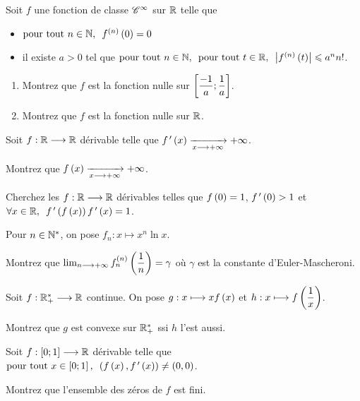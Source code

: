 \begin{exosss}
Soit \(f\) une fonction de classe \(\mathscr{C}^{\infty}\) sur \(\mathbb{R}\) telle que

\begin{itemize}
    \item \(\quantifs{\tpt n\in\N}f\deriv{n}\paren{0}=0\) \\
    \item il existe \(a>0\) tel que \(\quantifs{\tpt n\in\N;\tpt t\in\R}\abs{f\deriv{n}\paren{t}}\leq a^nn!\). \\
\end{itemize}

\begin{enumerate}
    \item Montrez que \(f\) est la fonction nulle sur \(\left[\dfrac{-1}{a};\dfrac{1}{a}\right]\). \\
    \item Montrez que \(f\) est la fonction nulle sur \(\mathbb{R}\).
\end{enumerate}
\end{exosss}

\begin{exo}
Soit \(f:\mathbb{R}\longrightarrow\mathbb{R}\) dérivable telle que \(f^{\,\prime}\left(x\right)\xrightarrow[x\longrightarrow+\infty]{}+\infty\).

Montrez que \(f\left(x\right)\xrightarrow[x\longrightarrow+\infty]{}+\infty\).
\end{exo}

\begin{exo}
Cherchez les \(f:\mathbb{R}\longrightarrow\mathbb{R}\) dérivables telles que \(f\left(0\right)=1\), \(f^{\,\prime}\left(0\right)>1\) et \(\quantifs{\forall x\in\R}f\prim\paren{f\paren{x}}f\prim\paren{x}=1\).
\end{exo}

\begin{exo}
Pour \(n\in\mathbb{N}^*\), on pose \(f_n:x\mapsto x^n\ln x\).

Montrez que \(\lim_{n\longrightarrow+\infty}f_n^{\left(n\right)}\left(\dfrac{1}{n}\right)=\gamma\) où \(\gamma\) est la constante d'Euler-Mascheroni.
\end{exo}

\begin{exo}
Soit \(f:\mathbb{R}_+^*\longrightarrow\mathbb{R}\) continue. On pose \(g:x\longmapsto xf\left(x\right)\) et \(h:x\longmapsto f\left(\dfrac{1}{x}\right)\).

Montrez que \(g\) est convexe sur \(\mathbb{R}_+^*\) ssi \(h\) l'est aussi.
\end{exo}

\begin{exo}
Soit \(f:\left[0;1\right]\longrightarrow\mathbb{R}\) dérivable telle que \(\quantifs{\tpt x\in\intervii{0}{1}}\paren{f\paren{x},f\prim\paren{x}}\not=\paren{0,0}\).

Montrez que l'ensemble des zéros de \(f\) est fini.
\end{exo}

